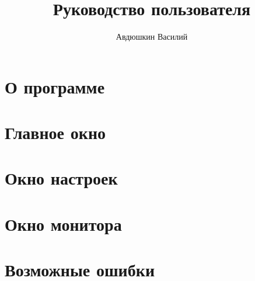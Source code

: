 \documentclass[a4paper,12pt,fleqn]{article}
\author{Авдюшкин Василий}
\title{Руководство пользователя}
\begin{document}
\pagestyle{empty}
\maketitle
\newpage
\pagestyle{plain}
\tableofcontents
\newpage

\section{О программе}



\section{Главное окно}



\section{Окно настроек}



\section{Окно монитора}



\section{Возможные ошибки}


\end{document}
